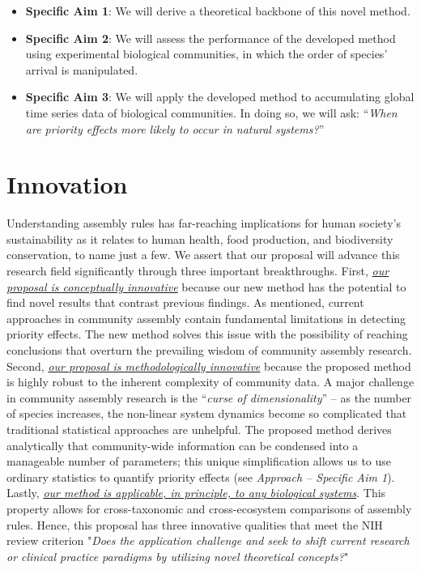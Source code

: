 \documentclass[12pt, class=article, crop=false]{standalone}
\begin{document}
\begin{itemize}
    \item \textbf{Specific Aim 1}: We will derive a theoretical backbone of this novel method.
    \item \textbf{Specific Aim 2}: We will assess the performance of the developed method using experimental biological communities, in which the order of species' arrival is manipulated.
    \item \textbf{Specific Aim 3}: We will apply the developed method to accumulating global time series data of biological communities. In doing so, we will ask: ``\textit{When are priority effects more likely to occur in natural systems?}''
\end{itemize}

\section{Innovation}
Understanding assembly rules has far-reaching implications for human society's sustainability as it relates to human health, food production, and biodiversity conservation, to name just a few.
We assert that our proposal will advance this research field significantly through three important breakthroughs.
First, \ul{\emph{our proposal is conceptually innovative}} because our new method has the potential to find novel results that contrast previous findings.
As mentioned, current approaches in community assembly contain fundamental limitations in detecting priority effects.
The new method solves this issue with the possibility of reaching conclusions that overturn the prevailing wisdom of community assembly research.
Second, \ul{\emph{our proposal is methodologically innovative}} because the proposed method is highly robust to the inherent complexity of community data.
A major challenge in community assembly research is the ``\textit{curse of dimensionality}'' -- as the number of species increases, the non-linear system dynamics become so complicated that traditional statistical approaches are unhelpful.
The proposed method derives analytically that community-wide information can be condensed into a manageable number of parameters; this unique simplification allows us to use ordinary statistics to quantify priority effects (see \textit{Approach -- Specific Aim 1}).
Lastly, \ul{\emph{our method is applicable, in principle, to any biological systems}}.
This property allows for cross-taxonomic and cross-ecosystem comparisons of assembly rules.
Hence, this proposal has three innovative qualities that meet the NIH review criterion "\emph{Does the application challenge and seek to shift current research or clinical practice paradigms by utilizing novel theoretical concepts?}"
\end{document}
